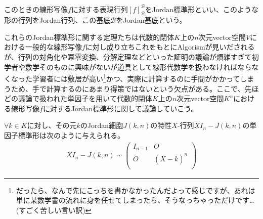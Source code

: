 \documentclass[dvipdfmx]{jsarticle}
\begin{document}
\begin{dfn*}
このときの線形写像$f$に対する表現行列$[ f]_{\mathcal{B}}^{\mathcal{B}}$をJordan標準形といい、このような形の行列をJordan行列、この基底$\mathcal{B}$をJordan基底という。
\end{dfn*}\par
これらのJordan標準形に関する定理たちは代数的閉体$K$上の$n$次元vector空間$V$における一般的な線形写像$f$に対し成り立ちこれをもとにAlgorismが見いだされるが、行列の対角化や冪零変換、分解定理などといった証明の議論が煩雑すぎて初学者や数学そのものに興味がないが道具として線形代数学を扱わなければならなくなった学習者には敷居が高い\footnote{だったら、なんで先にこっちを書かなかったんだよって感じですが、あれは単に某数学書の流れに身を任せてしまったら、そうなっちゃっただけです…(すごく苦しい言い訳)}かつ、実際に計算するのに手間がかかってしまうため、手で計算するのにあまり得策ではないという欠点がある。ここで、先ほどの議論で扱われた単因子を用いて代数的閉体$K$上の$n$次元vector空間$K^{n}$における線形写像$f$に対するJordan標準形に関して議論していこう。
\begin{thm}\label{2.2.8.13}
$\forall k \in K$に対し、その元$k$のJordan細胞$J(k,n)$の特性$X$-行列$XI_{n} - J(k,n)$の単因子標準形は次のように与えられる。
\begin{align*}
XI_{n} - J(k,n) \sim \begin{pmatrix}
I_{n - 1} & O \\
O & \left( X - \overline{k} \right)^{n} \\
\end{pmatrix}
\end{align*}
\end{thm}
\end{document}
